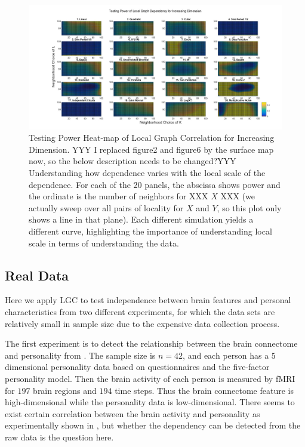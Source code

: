 \documentclass[11pt]{article}
\begin{document}
\begin{figure}[htbp]
\includegraphics[width=1.0\textwidth]{../Figures/Fig6s}
\caption{Testing Power Heat-map of Local Graph Correlation for Increasing Dimension.
YYY I replaced figure2 and figure6 by the surface map now, so the below description needs to be changed?YYY
Understanding how dependence varies with the local scale of the dependence.  For each of the 20 panels, the abscissa shows power and the ordinate is the number of neighbors for XXX $X$ XXX (we actually sweep over all pairs of locality for $X$ and $Y$, so this plot only shows a line in that plane).  Each different simulation yields a different curve, highlighting the importance of understanding local scale in terms of understanding the data.}
\label{figSim2}
\end{figure}







\subsection{Real Data}
\label{numer2}
Here we apply LGC to test independence between brain features and personal characteristics from two different experiments, for which the data sets are relatively small in sample size due to the expensive data collection process. 

The first experiment is to detect the relationship between the brain connectome and personality from \cite{AdelsteinEtAl2011}. The sample size is $n=42$, and each person has a $5$ dimensional personality data based on questionnaires and the five-factor personality model. Then the brain activity of each person is measured by fMRI for $197$ brain regions and $194$ time steps. Thus the brain connectome feature is high-dimensional while the personality data is low-dimensional. There seems to exist certain correlation between the brain activity and personality as experimentally shown in \cite{AdelsteinEtAl2011}, but whether the dependency can be detected from the raw data is the question here.
\end{document}
